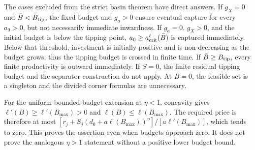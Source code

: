 The cases excluded from the strict basin theorem have direct answers.
If $g_X=0$ and $\bar B<B_{\rm tip}$, the fixed budget and $g_a>0$
ensure eventual capture for every $a_0>0$, but not necessarily immediate
inwardness. If $g_a=0$, $g_X>0$, and the initial budget is below the
tipping point, $a_0\geq a_{\rm crit}^{\ell}(\bar B)$ is captured
immediately. Below that threshold, investment is initially positive and
is non-decreasing as the budget grows; thus the tipping budget is crossed
in finite time. If $\bar B\geq B_{\rm tip}$, every finite productivity
is outward immediately. If $S=0$, the finite residual tipping budget and
the separator construction do not apply. At $B=0$, the feasible set is
a singleton and the divided corner formulas are unnecessary.

For the uniform bounded-budget extension at $\eta<1$, concavity gives
$\ell'(B)\geq\ell'(B_{\max})>0$ and $\ell(B)\leq\ell(B_{\max})$.
The required price is therefore at most
$[r_j+S_j(d_0+a\ell(B_{\max}))^\eta]/[a\ell'(B_{\max})]$,
which tends to zero. This proves the assertion even when budgets approach
zero. It does not prove the analogous $\eta>1$ statement without a positive
lower budget bound.


